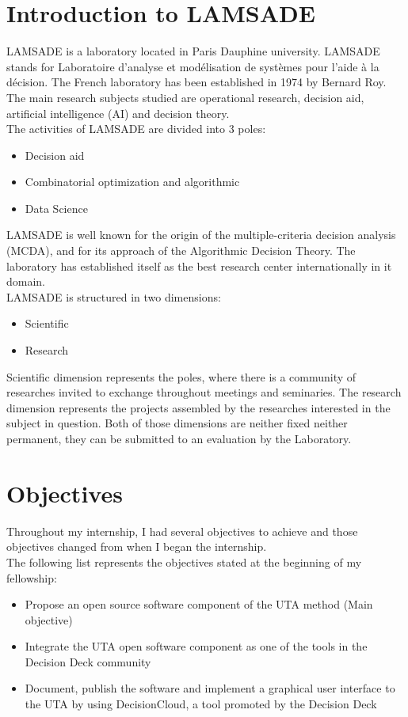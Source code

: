\documentclass{report}
\begin{document}
\section{Introduction to LAMSADE}
LAMSADE is a laboratory located in Paris Dauphine university. LAMSADE stands for Laboratoire d'analyse et modélisation de systèmes pour l'aide à la décision. The French laboratory has been established in 1974 by Bernard Roy. The main research subjects studied are operational research, decision aid, artificial intelligence (AI) and decision theory. \\
The activities of LAMSADE are divided into 3 poles: 
\begin{itemize}
\item Decision aid 
\item Combinatorial optimization and algorithmic
\item Data Science
\end{itemize}
LAMSADE is well known for the origin of the multiple-criteria decision analysis (MCDA), and for its approach of  the Algorithmic Decision Theory. The laboratory has established itself as the best research center internationally in it domain. \\
LAMSADE is structured in two  dimensions:
\begin{itemize}
\item Scientific 
\item Research
\end{itemize}
Scientific dimension represents the poles, where there is a community of researches invited to exchange throughout meetings and seminaries. The research dimension represents the projects assembled by the researches interested in the subject in question. Both of those dimensions are neither fixed neither permanent, they can be submitted to an evaluation by the Laboratory. 

\section{Objectives}
Throughout my  internship, I had several objectives to achieve and those objectives changed from when I began the internship. \\
The following list represents the objectives stated at the beginning of my fellowship: 
\begin{itemize}
\item Propose an open source software component of the UTA method (Main objective)
\item Integrate the UTA open software component as one of the tools in the Decision Deck community
\item Document, publish the software and implement a graphical user interface to the UTA by using DecisionCloud, a tool promoted by the Decision Deck
\end{itemize}
\end{document}
